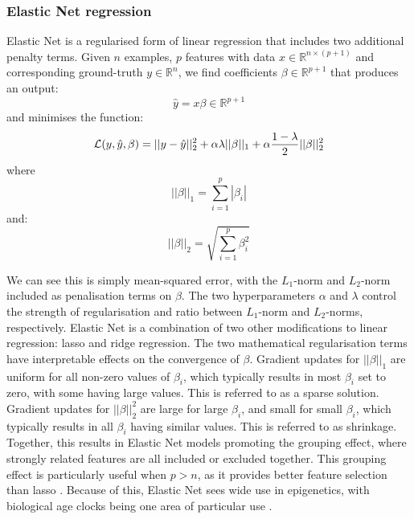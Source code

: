 \documentclass{article}
\newcommand{\equationname}[1]{%
    \begingroup
        \leavevmode
        \addcontentsline{equ}{equations}{\protect\numberline{\theequation}#1}%
    \endgroup   
}
\begin{document}
\subsubsection{Elastic Net regression}
Elastic Net \cite{zou2005regularization} is a regularised form of linear regression that includes two additional penalty terms.
Given \(n\) examples, \(p\) features with data \(x \in \mathbb{R}^{n \times (p + 1)}\) and corresponding ground-truth \(y \in \mathbb{R}^n\), we find coefficients \(\beta \in \mathbb{R}^{p + 1}\) that produces an output:
\[\hat{y} = x \beta \in \mathbb{R}^{p + 1}\]
and minimises the function:
\begin{equation} \equationname{Elastic Net linear regression}
    \mathcal{L}(y, \hat{y}, \beta) = ||y - \hat{y}||_2^2 + \alpha\lambda||\beta||_1 + \alpha\frac{1 - \lambda}{2}||\beta||_2^2
\end{equation}
where
\[||\beta||_1 = \sum_{i=1}^{p} |\beta_i|\]
and:
\[||\beta||_2 = \sqrt{\sum_{i=1}^{p} \beta_i^2}\]

We can see this is simply mean-squared error, with the \(L_1\)-norm and \(L_2\)-norm included as penalisation terms on \(\beta\). The two hyperparameters \(\alpha\) and \(\lambda\) control the strength of regularisation and ratio between \(L_1\)-norm and \(L_2\)-norms, respectively. Elastic Net is a combination of two other modifications to linear regression: lasso \cite{tibshirani1996regression} and ridge \cite{hoerl1970ridge} regression. The two mathematical regularisation terms have interpretable effects on the convergence of \(\beta\). Gradient updates for \(||\beta||_1\) are uniform for all non-zero values of \(\beta_i\), which typically results in most \(\beta_i\) set to zero, with some having large values. This is referred to as a sparse solution. Gradient updates for \(||\beta||_2^2\) are large for large \(\beta_i\), and small for small \(\beta_i\), which typically results in all \(\beta_i\) having similar values. This is referred to as shrinkage. Together, this results in Elastic Net models promoting the grouping effect, where strongly related features are all included or excluded together. This grouping effect is particularly useful when \(p > n\), as it provides better feature selection than lasso \cite{zou2005regularization}. Because of this, Elastic Net sees wide use in epigenetics, with biological age clocks being one area of particular use \cite{teschendorff2025epigenetic}.
\end{document}

